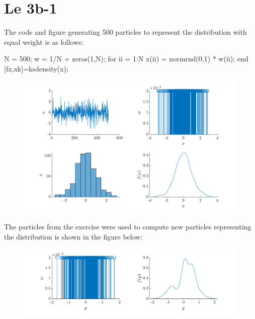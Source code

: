 \section{Le 3b-1}

The code and figure generating 500 particles to represent the distribution with equal weight is as follows:
\begin{matlabcode}
N = 500;
w = 1/N + zeros(1,N);
for ii = 1:N
    x(ii) = normrnd(0,1) * w(ii);
end
[fx,xk]=ksdensity(x); 
\end{matlabcode}
\begin{figure}[!h]
    \centering
    \includegraphics{figures/ex4_a.pdf}
\end{figure}


The particles from the exercise were used to compute new particles 
representing the distribution is shown in the figure below:
\begin{figure}[!h]
    \centering
    \includegraphics{figures/ex4_b.pdf}
\end{figure}
